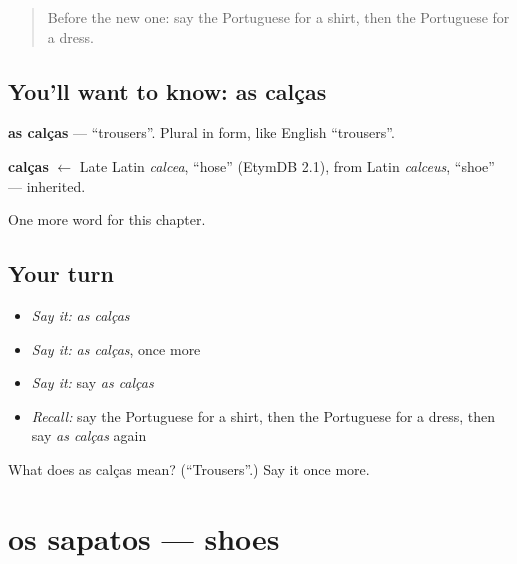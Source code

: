 \label{lesson:PT-C77-calcas}



\begin{quote}
Before the new one: say the Portuguese for a shirt, then the Portuguese for a dress.
\end{quote}

\subsection*{You'll want to know: as calças}
\textbf{as calças} — \textquotedblleft{}trousers\textquotedblright{}. Plural in form, like English \textquotedblleft{}trousers\textquotedblright{}.

\begin{cousinweb}
\textbf{calças} $\leftarrow$ Late Latin \emph{calcea}, \textquotedblleft{}hose\textquotedblright{} (EtymDB 2.1), from Latin \emph{calceus}, \textquotedblleft{}shoe\textquotedblright{} — inherited.
\end{cousinweb}

\begin{grammarlens}[title={What you've built}]
One more word for this chapter.
\end{grammarlens}

\subsection*{Your turn}
\begin{itemize}
\raggedright
  \item \emph{Say it:} \emph{as calças}
  \item \emph{Say it:} \emph{as calças}, once more
  \item \emph{Say it:} say \emph{as calças}
  \item \emph{Recall:} say the Portuguese for a shirt, then the Portuguese for a dress, then say \emph{as calças} again
\end{itemize}

\begin{tcolorbox}[breakable,colback=teal!4,colframe=teal!35!black,title={Before you move on}]
What does as calças mean? (\textquotedblleft{}Trousers\textquotedblright{}.) Say it once more.
\end{tcolorbox}
\section[os sapatos]{os sapatos — shoes}

\label{lesson:PT-C77-sapatos}



